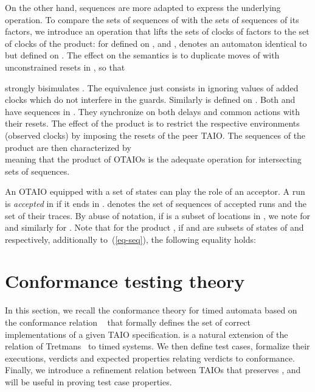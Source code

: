 \documentclass{LMCS}
\theoremstyle{plain}\newtheorem{proposition}[thm]{Proposition}
\begin{document}
On the other hand, sequences are more adapted to express the underlying operation.
 To compare the sets of sequences of
   with the sets of sequences of
  its factors, we introduce an operation that lifts the sets of clocks
  of factors to the set of clocks of the product: for 
  defined on , and ,
   denotes
  an automaton identical to 
  but defined on
  .  The effect on the semantics is to
  duplicate moves of  with unconstrained resets in
  , so that
  
  strongly bisimulates .  
  The equivalence just consists in ignoring values of added clocks which do not interfere in the guards.
  Similarly
   is
  defined on .  
  Both
   and
   have
  sequences in
  . They synchronize on both delays and common actions with their resets.
The effect of the product is to restrict the respective environments  (observed clocks) 
by imposing the resets of the peer TAIO. 
The sequences of the product  are then characterized by\\

 meaning that the product of OTAIOs is the adequate operation for
intersecting sets of sequences. 



An OTAIO  equipped 
with a set of states  can play the role of an acceptor.
A run is  {\em accepted} in  if it ends in .
 denotes the set of sequences of accepted runs
and  the set of their traces.
By abuse of notation, if  is a subset of locations in ,
we note  for  and 
similarly for . 
Note that for the product , if  and 
are subsets of states of  and  respectively, additionally to~(\ref{eq-seq}), the following equality holds:




\section{Conformance testing theory}
\label{sec-conformance}

In this section, we recall the conformance theory for timed automata
based on the conformance relation \tioco~\cite{KrichenTripakis09}
 that formally defines the set of correct
implementations of a given TAIO specification.   is a natural
extension of the  relation of Tretmans~\cite{Tretmans-SCT96} to timed
systems.  We then define test cases, formalize their executions,
verdicts and expected properties relating verdicts to conformance. 
Finally, we introduce a refinement
relation between TAIOs that preserves \tioco, and will be useful in proving 
test case properties.
\end{document}
